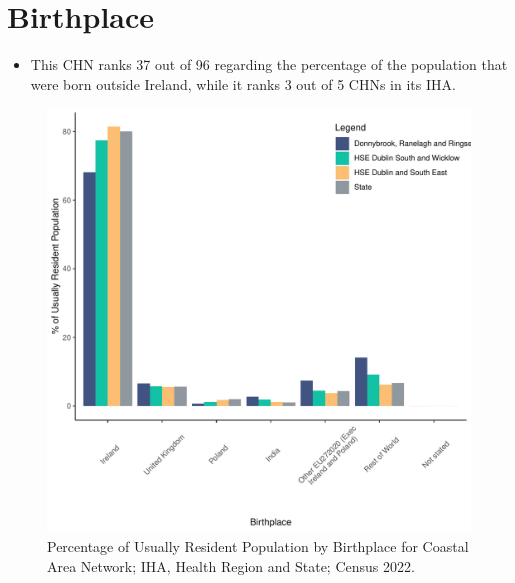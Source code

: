 \documentclass{article}
\begin{document}
\section{Birthplace}\label{sect:Birth}
\begin{itemize}
\item This CHN ranks  37 out of 96 regarding the percentage of the population that were born outside Ireland, while it ranks  3 out of 5 CHNs in its IHA.
\end{itemize}
\begin{figure}[H]
	\centering
	\includegraphics[width = 130mm]{../figures/BirthED.pdf}
	\caption{Percentage of Usually Resident Population by Birthplace for Coastal Area Network; IHA, Health Region and State; Census 2022.}
	\label{fig:vbnv}
	\end{figure}
	
\end{document}
